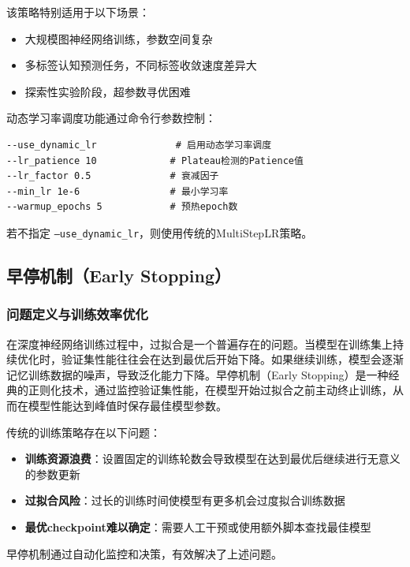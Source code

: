\documentclass[UTF8, a4paper, 12pt]{article}
\begin{document}
该策略特别适用于以下场景：
\begin{itemize}
    \item 大规模图神经网络训练，参数空间复杂
    \item 多标签认知预测任务，不同标签收敛速度差异大
    \item 探索性实验阶段，超参数寻优困难
\end{itemize}


动态学习率调度功能通过命令行参数控制：

\begin{verbatim}
--use_dynamic_lr              # 启用动态学习率调度
--lr_patience 10             # Plateau检测的Patience值
--lr_factor 0.5              # 衰减因子
--min_lr 1e-6                # 最小学习率
--warmup_epochs 5            # 预热epoch数
\end{verbatim}

若不指定 \texttt{--use\_dynamic\_lr}，则使用传统的MultiStepLR策略。

\subsection{早停机制（Early Stopping）}

\subsubsection{问题定义与训练效率优化}

在深度神经网络训练过程中，过拟合是一个普遍存在的问题。当模型在训练集上持续优化时，验证集性能往往会在达到最优后开始下降。如果继续训练，模型会逐渐记忆训练数据的噪声，导致泛化能力下降。早停机制（Early Stopping）是一种经典的正则化技术，通过监控验证集性能，在模型开始过拟合之前主动终止训练，从而在模型性能达到峰值时保存最佳模型参数。

传统的训练策略存在以下问题：

\begin{itemize}
    \item \textbf{训练资源浪费}：设置固定的训练轮数会导致模型在达到最优后继续进行无意义的参数更新
    \item \textbf{过拟合风险}：过长的训练时间使模型有更多机会过度拟合训练数据
    \item \textbf{最优checkpoint难以确定}：需要人工干预或使用额外脚本查找最佳模型
\end{itemize}

早停机制通过自动化监控和决策，有效解决了上述问题。
\end{document}
